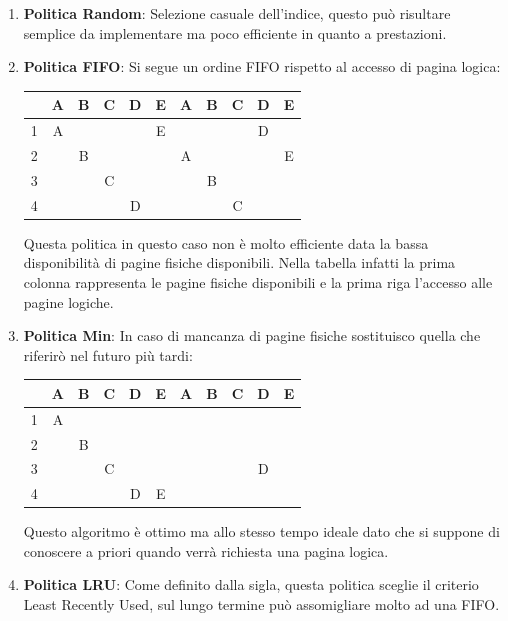 \documentclass{article}
\begin{document}
\begin{enumerate}
    \item \textbf{Politica Random}: Selezione casuale dell'indice, questo può risultare semplice da implementare ma poco efficiente in quanto a prestazioni.
    \item \textbf{Politica FIFO}: Si segue un ordine FIFO rispetto al accesso di pagina logica:
    \begin{center}
        \begin{tabular}{ |c|c|c|c|c|c|c|c|c|c|c| } 
         \hline
           & A & B & C & D & E & A & B & C & D & E \\ 
         \hline
         1 & A &  &  &  & E &  &  &  & D &  \\ 
         \hline
         2 &  & B &  &  &  & A &  &  &  &  E \\ 
         \hline
         3 &  &  & C &  &  &  & B &  &  &  \\ 
         \hline
         4 &  &  &  & D &  &  &  & C &  &  \\ 
         \hline
        \end{tabular}
        \end{center}
    Questa politica in questo caso non è molto efficiente data la bassa disponibilità di pagine fisiche disponibili. Nella tabella infatti la prima colonna rappresenta le pagine fisiche disponibili e la prima riga l'accesso alle pagine logiche.
    \item \textbf{Politica Min}: In caso di mancanza di pagine fisiche sostituisco quella che riferirò nel futuro più tardi:
    \begin{center}
        \begin{tabular}{ |c|c|c|c|c|c|c|c|c|c|c| } 
         \hline
           & A & B & C & D & E & A & B & C & D & E \\ 
         \hline
         1 & A &  &  &  &  &  &  &  &  &  \\ 
         \hline
         2 &  & B &  &  &  &  &  &  &  &   \\ 
         \hline
         3 &  &  & C &  &  &  &  &  & D &  \\ 
         \hline
         4 &  &  &  & D & E &  &  &  &  &  \\ 
         \hline
        \end{tabular}
        \end{center}
    Questo algoritmo è ottimo ma allo stesso tempo ideale dato che si suppone di conoscere a priori quando verrà richiesta una pagina logica.
    \item \textbf{Politica LRU}: Come definito dalla sigla, questa politica sceglie il criterio Least Recently Used, sul lungo termine può assomigliare molto ad una FIFO.

\end{enumerate}
\end{document}
